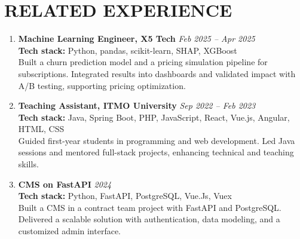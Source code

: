 \documentclass[11pt,a4paper]{moderncv}
\renewcommand\small{\fontsize{9}{10}\selectfont}
\begin{document}
\section{RELATED EXPERIENCE}
\begin{enumerate}[leftmargin=1em, itemsep=0.01em, labelsep=0.2em]
  \item \textbf{\color{darkblue} Machine Learning Engineer, X5 Tech} \hfill \textit{Feb 2025 -- Apr 2025} \\
  {\small \textbf{Tech stack:} Python, pandas, scikit-learn, SHAP, XGBoost}\\
  {\small Built a churn prediction model and a pricing simulation pipeline for subscriptions. Integrated results into dashboards and validated impact with A/B testing, supporting pricing optimization.}

  \item \textbf{\color{darkblue} Teaching Assistant, ITMO University} \hfill \textit{Sep 2022 -- Feb 2023} \\
  {\small \textbf{Tech stack:} Java, Spring Boot, PHP, JavaScript, React, Vue.js, Angular, HTML, CSS \\
  Guided first-year students in programming and web development. Led Java sessions and mentored full-stack projects, enhancing technical and teaching skills.}

  \item \textbf{\color{darkblue} CMS on FastAPI} \hfill \textit{2024} \\
   {\small \textbf{Tech stack:} Python, FastAPI, PostgreSQL, Vue.Js, Vuex \\
  Built a CMS in a contract team project with FastAPI and PostgreSQL. Delivered a scalable solution with authentication, data modeling, and a customized admin interface.}
\end{enumerate}

\vspace{-1em}
\end{document}
